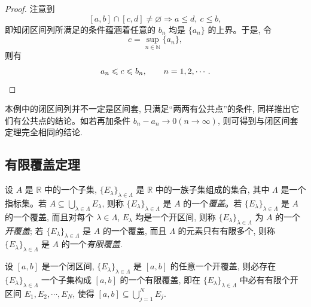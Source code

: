 \begin{proof}
注意到
\[
  [a,b]\cap[c,d]\ne\varnothing\Rightarrow a\leqslant d,\ c\leqslant b,
\]
即知闭区间列所满足的条件蕴涵着任意的 $b_n$ 均是 $\{a_n\}$ 的上界。于是, 令
\[
  c=\sup_{n\in\mathbb{N}}\{a_n\},
\]
则有
\[
  a_n\leqslant c\leqslant b_n,\qquad n=1,2,\cdots .
\qedhere
\]
\end{proof}


\begin{remark}\label{remark:ma-2-source-70}
本例中的闭区间列并不一定是区间套, 只满足``两两有公共点''的条件, 同样推出它们有公共点的结论。如若再加条件 $b_n-a_n\to0(n\to\infty)$, 则可得到与闭区间套定理完全相同的结论.
\end{remark}


\subsection{有限覆盖定理}
\label{subsec:ma-2-4-2}

设 $A$ 是 $\mathbb{R}$ 中的一个子集, $\{E_\lambda\}_{\lambda\in\Lambda}$ 是 $\mathbb{R}$ 中的一族子集组成的集合, 其中 $\Lambda$ 是一个指标集。若 $A\subseteq\bigcup_{\lambda\in\Lambda}E_\lambda$, 则称 $\{E_\lambda\}_{\lambda\in\Lambda}$ 是 $A$ 的一个\emph{覆盖}。若 $\{E_\lambda\}_{\lambda\in\Lambda}$ 是 $A$ 的一个覆盖, 而且对每个 $\lambda\in\Lambda$, $E_\lambda$ 均是一个开区间, 则称 $\{E_\lambda\}_{\lambda\in\Lambda}$ 为 $A$ 的一个\emph{开覆盖}; 若 $\{E_\lambda\}_{\lambda\in\Lambda}$ 是 $A$ 的一个覆盖, 而且 $\Lambda$ 的元素只有有限多个, 则称 $\{E_\lambda\}_{\lambda\in\Lambda}$ 是 $A$ 的一个\emph{有限覆盖}.

\begin{theorem}[{有限覆盖定理}]\label{theorem:ma-2-4-2}
设 $[a,b]$ 是一个闭区间, $\{E_\lambda\}_{\lambda\in\Lambda}$ 是 $[a,b]$ 的任意一个开覆盖, 则必存在 $\{E_\lambda\}_{\lambda\in\Lambda}$ 一个子集构成 $[a,b]$ 的一个有限覆盖, 即在 $\{E_\lambda\}_{\lambda\in\Lambda}$ 中必有有限个开区间 $E_1,E_2,\cdots,E_N$, 使得 $[a,b]\subseteq\bigcup\limits_{j=1}^N E_j$.
\end{theorem}


